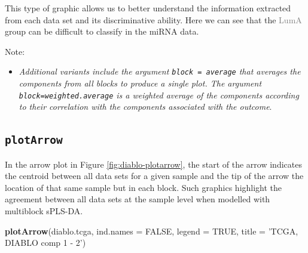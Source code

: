 \documentclass[]{book}
\newenvironment{Shaded}{\begin{snugshade}}{\end{snugshade}}
\newcommand{\DataTypeTok}[1]{\textcolor[rgb]{0.13,0.29,0.53}{#1}}
\newcommand{\KeywordTok}[1]{\textcolor[rgb]{0.13,0.29,0.53}{\textbf{#1}}}
\newcommand{\NormalTok}[1]{#1}
\newcommand{\OtherTok}[1]{\textcolor[rgb]{0.56,0.35,0.01}{#1}}
\newcommand{\StringTok}[1]{\textcolor[rgb]{0.31,0.60,0.02}{#1}}
\providecommand{\tightlist}{%
  \setlength{\itemsep}{0pt}\setlength{\parskip}{0pt}}
\begin{document}
This type of graphic allows us to better understand the information extracted from each data set and its discriminative ability. Here we can see that the \textcolor{grey}{LumA} group can be difficult to classify in the miRNA data.

Note:

\begin{itemize}
\tightlist
\item
  \emph{Additional variants include the argument \texttt{block\ =\ \textquotesingle{}average\textquotesingle{}} that averages the components from all blocks to produce a single plot. The argument \texttt{block=\textquotesingle{}weighted.average\textquotesingle{}} is a weighted average of the components according to their correlation with the components associated with the outcome}.
\end{itemize}

\hypertarget{plotarrow}{%
\subsection{\texorpdfstring{\texttt{plotArrow}}{plotArrow}}\label{plotarrow}}

In the arrow plot in Figure \ref{fig:diablo-plotarrow}, the start of the arrow indicates the centroid between all data sets for a given sample and the tip of the arrow the location of that same sample but in each block. Such graphics highlight the agreement between all data sets at the sample level when modelled with multiblock sPLS-DA.

\begin{Shaded}
\begin{Highlighting}[]
\KeywordTok{plotArrow}\NormalTok{(diablo.tcga, }\DataTypeTok{ind.names =} \OtherTok{FALSE}\NormalTok{, }\DataTypeTok{legend =} \OtherTok{TRUE}\NormalTok{, }
          \DataTypeTok{title =} \StringTok{'TCGA, DIABLO comp 1 - 2'}\NormalTok{)}
\end{Highlighting}
\end{Shaded}
\end{document}
